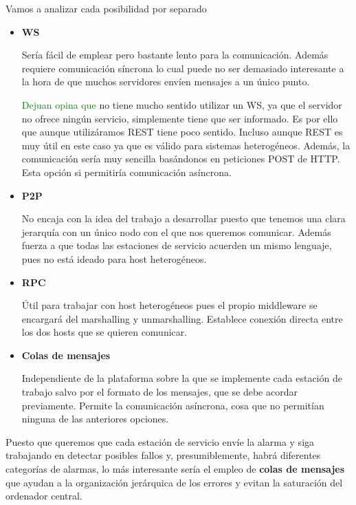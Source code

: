 \begin{problem}[13]
      \spart

      Vamos a analizar cada posibilidad por separado

      \begin{itemize}
      \item \textbf{WS}

      Sería fácil de emplear pero bastante lento para la comunicación. Además requiere comunicación síncrona lo cual puede no ser demasiado interesante a la hora de que muchos servidores envíen mensajes a un único punto.


      \textcolor{green}{Dejuan opina que} no tiene mucho sentido utilizar un WS, ya que el servidor no ofrece ningún servicio, simplemente tiene que ser informado. Es por ello que aunque utilizáramos REST tiene poco sentido. Incluso aunque REST es muy útil en este caso ya que es válido para sistemas heterogéneos. Además, la comunicación sería muy sencilla basándonos en peticiones POST de HTTP. Esta opción si permitiría comunicación asíncrona.

      \item \textbf{P2P}

      No encaja con la idea del trabajo a desarrollar puesto que tenemos una clara jerarquía con un único nodo con el que nos queremos comunicar. Además fuerza a que todas las estaciones de servicio acuerden un mismo lenguaje, pues no está ideado para host heterogéneos.

      \item \textbf{RPC}

      Útil para trabajar con host heterogéneos pues el propio middleware se encargará del marshalling y unmarshalling. Establece conexión directa entre los dos hosts que se quieren comunicar.

      \item \textbf{Colas de mensajes}

      Independiente de la plataforma sobre la que se implemente cada estación de trabajo salvo por el formato de los mensajes, que se debe acordar previamente. Permite la comunicación asíncrona, cosa que no permitían ninguna de las anteriores opciones.

      \end{itemize}
    Puesto que queremos que cada estación de servicio envíe la alarma y siga trabajando en detectar posibles fallos y, presumiblemente, habrá diferentes categorías de alarmas, lo más interesante sería el empleo de \textbf{colas de mensajes} que ayudan a la organización jerárquica de los errores y evitan la saturación del ordenador central.


\end{problem}

